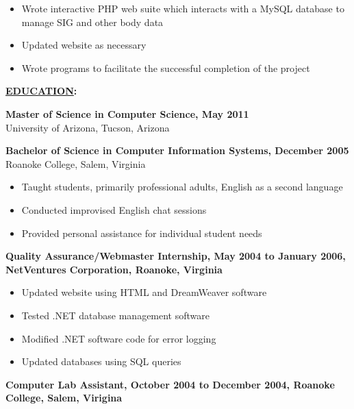 \documentclass[10pt]{res}
\begin{document}
\begin{resume}
\begin{itemize}
\setlength{\itemsep}{1pt}
\setlength{\parskip}{0pt}
\setlength{\parsep}{0pt}
\item Wrote interactive PHP web suite which interacts with a MySQL database to manage SIG and other body data
\item Updated website as necessary
\item Wrote programs to facilitate the successful completion of the project
\end{itemize}

\begin{flushleft}
{\bf \underline{EDUCATION}:}
\end{flushleft}
{\bf Master of Science in Computer Science, May 2011}\\
University of Arizona, Tucson, Arizona

\begin{flushleft}
{\bf Bachelor of Science in Computer Information Systems, December 2005}\\
Roanoke College, Salem, Virginia
\end{flushleft}


\begin{itemize}
\setlength{\itemsep}{1pt}
\setlength{\parskip}{0pt}
\setlength{\parsep}{0pt}
\item Taught students, primarily professional adults, English as a second language
\item Conducted improvised English chat sessions
\item Provided personal assistance for individual student needs
\end{itemize}

\begin{flushleft}
{\bf Quality Assurance/Webmaster Internship, May 2004 to January 2006, NetVentures Corporation, Roanoke, Virginia}
\end{flushleft}

\begin{itemize}
\setlength{\itemsep}{1pt}
\setlength{\parskip}{0pt}
\setlength{\parsep}{0pt}
\item Updated website using HTML and DreamWeaver software
\item Tested .NET database management software
\item Modified .NET software code for error logging
\item Updated databases using SQL queries
\end{itemize}

\begin{flushleft}
{\bf Computer Lab Assistant, October 2004 to December 2004, Roanoke College, Salem, Virigina}
\end{flushleft}


\end{resume}
\end{document}
